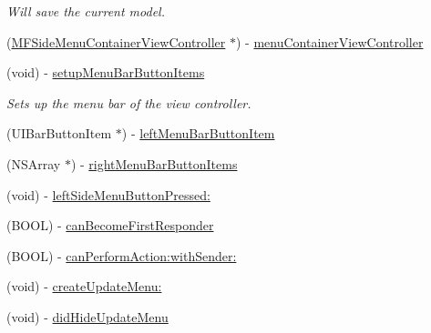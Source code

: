 \begin{DoxyCompactItemize}
\begin{DoxyCompactList}\small\item\em Will save the current model. \end{DoxyCompactList}\item 
(\hyperlink{interface_m_f_side_menu_container_view_controller}{M\-F\-Side\-Menu\-Container\-View\-Controller} $\ast$) -\/ \hyperlink{interface_model_section_view_controller_ad9f497773e1c2f5e420929a60f3bf7df}{menu\-Container\-View\-Controller}
\item 
(void) -\/ \hyperlink{interface_model_section_view_controller_a9644bcb73520daa217ad0709b0e6bd64}{setup\-Menu\-Bar\-Button\-Items}
\begin{DoxyCompactList}\small\item\em Sets up the menu bar of the view controller. \end{DoxyCompactList}\item 
(U\-I\-Bar\-Button\-Item $\ast$) -\/ \hyperlink{interface_model_section_view_controller_afb11718c8a0c6f7abd85dfbc7adb1cd1}{left\-Menu\-Bar\-Button\-Item}
\item 
(N\-S\-Array $\ast$) -\/ \hyperlink{interface_model_section_view_controller_a78c969d7bca3de65268ac706059e291c}{right\-Menu\-Bar\-Button\-Items}
\item 
(void) -\/ \hyperlink{interface_model_section_view_controller_a738b842dc5261f08da93880f0b006b55}{left\-Side\-Menu\-Button\-Pressed\-:}
\item 
(B\-O\-O\-L) -\/ \hyperlink{interface_model_section_view_controller_ade65ba8ae784e35b1f2b23a55afbbf9b}{can\-Become\-First\-Responder}
\item 
(B\-O\-O\-L) -\/ \hyperlink{interface_model_section_view_controller_a4a5338d3a62ac53d52a2b31880b6802c}{can\-Perform\-Action\-:with\-Sender\-:}
\item 
(void) -\/ \hyperlink{interface_model_section_view_controller_a8a501e57528492cf6ba20c9c966282e0}{create\-Update\-Menu\-:}
\item 
\hypertarget{interface_model_section_view_controller_aa7642eed869c29236ca6198804aa9624}{(void) -\/ \hyperlink{interface_model_section_view_controller_aa7642eed869c29236ca6198804aa9624}{did\-Hide\-Update\-Menu}}\label{interface_model_section_view_controller_aa7642eed869c29236ca6198804aa9624}


\end{DoxyCompactItemize}
